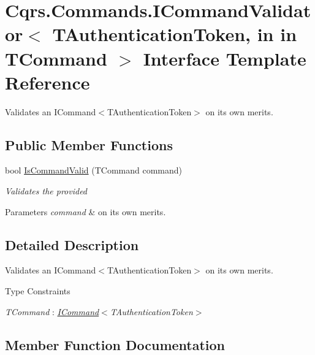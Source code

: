 \hypertarget{interfaceCqrs_1_1Commands_1_1ICommandValidator}{}\section{Cqrs.\+Commands.\+I\+Command\+Validator$<$ T\+Authentication\+Token, in in T\+Command $>$ Interface Template Reference}
\label{interfaceCqrs_1_1Commands_1_1ICommandValidator}


Validates an I\+Command$<$\+T\+Authentication\+Token$>$ on its own merits.  


\subsection*{Public Member Functions}
\begin{DoxyCompactItemize}
\item 
bool \hyperlink{interfaceCqrs_1_1Commands_1_1ICommandValidator_a8ac558179848dcb0ee56d2c3e7ad8cd9_a8ac558179848dcb0ee56d2c3e7ad8cd9}{Is\+Command\+Valid} (T\+Command command)
\begin{DoxyCompactList}\small\item\em Validates the provided 
\begin{DoxyParams}{Parameters}
{\em command} & on its own merits. \\
\hline
\end{DoxyParams}
\end{DoxyCompactList}\end{DoxyCompactItemize}


\subsection{Detailed Description}
Validates an I\+Command$<$\+T\+Authentication\+Token$>$ on its own merits. 

\begin{Desc}
\item[Type Constraints]\begin{description}
\item[{\em T\+Command} : {\em \hyperlink{interfaceCqrs_1_1Commands_1_1ICommand}{I\+Command}$<$T\+Authentication\+Token$>$}]\end{description}
\end{Desc}


\subsection{Member Function Documentation}
\mbox{\label{interfaceCqrs_1_1Commands_1_1ICommandValidator_a8ac558179848dcb0ee56d2c3e7ad8cd9_a8ac558179848dcb0ee56d2c3e7ad8cd9}} 
